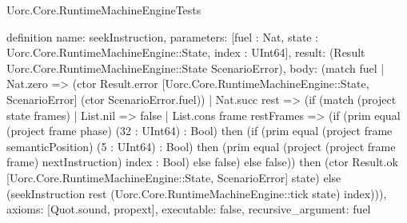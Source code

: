 \begin{lexlean}{Uorc.Core.RuntimeMachineEngineTests}
\begin{semanticmodule}
definition{
  name: seekInstruction,
  parameters: [fuel : Nat, state : Uorc.Core.RuntimeMachineEngine::State, index : UInt64],
  result: (Result Uorc.Core.RuntimeMachineEngine::State ScenarioError),
  body: (match fuel
    | Nat.zero => (ctor Result.error [Uorc.Core.RuntimeMachineEngine::State, ScenarioError] (ctor ScenarioError.fuel))
    | Nat.succ rest => (if (match (project state frames)
      | List.nil => false
      | List.cons frame restFrames => (if (prim equal (project frame phase) (32 : UInt64) : Bool) then (if (prim equal (project frame semanticPosition) (5 : UInt64) : Bool) then (prim equal (project (project frame frame) nextInstruction) index : Bool) else false) else false)) then (ctor Result.ok [Uorc.Core.RuntimeMachineEngine::State, ScenarioError] state) else (seekInstruction rest (Uorc.Core.RuntimeMachineEngine::tick state) index))),
  axioms: [Quot.sound, propext],
  executable: false,
  recursive_argument: fuel
}


\end{semanticmodule}
\end{lexlean}

